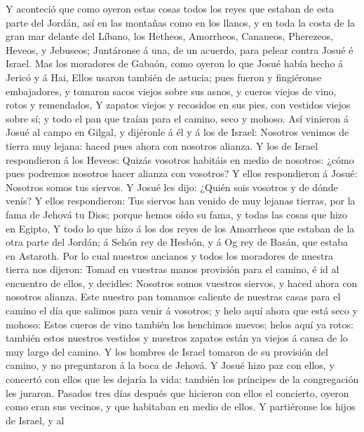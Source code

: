  Y aconteció que como oyeron estas cosas todos los reyes
que estaban de esta parte del Jordán, así en las montañas como en los
llanos, y en toda la costa de la gran mar delante del Líbano, los
Hetheos, Amorrheos, Cananeos, Pherezeos, Heveos, y Jebuseos;
 Juntáronse á una, de un acuerdo, para pelear contra Josué
é Israel.  Mas los moradores de Gabaón, como oyeron lo que
Josué había hecho á Jericó y á Hai,  Ellos usaron también
de astucia; pues fueron y fingiéronse embajadores, y tomaron sacos
viejos sobre sus asnos, y cueros viejos de vino, rotos y remendados,
 Y zapatos viejos y recosidos en sus pies, con vestidos
viejos sobre sí; y todo el pan que traían para el camino, seco y mohoso.
 Así vinieron á Josué al campo en Gilgal, y dijéronle á él
y á los de Israel: Nosotros venimos de tierra muy lejana: haced pues
ahora con nosotros alianza.  Y los de Israel respondieron
á los Heveos: Quizás vosotros habitáis en medio de nosotros: ¿cómo pues
podremos nosotros hacer alianza con vosotros?  Y ellos
respondieron á Josué: Nosotros somos tus siervos. Y Josué les dijo:
¿Quién sois vosotros y de dónde venís?  Y ellos
respondieron: Tus siervos han venido de muy lejanas tierras, por la fama
de Jehová tu Dios; porque hemos oído su fama, y todas las cosas que hizo
en Egipto,  Y todo lo que hizo á los dos reyes de los
Amorrheos que estaban de la otra parte del Jordán; á Sehón rey de
Hesbón, y á Og rey de Basán, que estaba en Astaroth.  Por
lo cual nuestros ancianos y todos los moradores de nuestra tierra nos
dijeron: Tomad en vuestras manos provisión para el camino, é id al
encuentro de ellos, y decidles: Nosotros somos vuestros siervos, y haced
ahora con nosotros alianza.  Este nuestro pan tomamos
caliente de nuestras casas para el camino el día que salimos para venir
á vosotros; y helo aquí ahora que está seco y mohoso: 
Estos cueros de vino también los henchimos nuevos; helos aquí ya rotos:
también estos nuestros vestidos y nuestros zapatos están ya viejos á
causa de lo muy largo del camino.  Y los hombres de
Israel tomaron de su provisión del camino, y no preguntaron á la boca de
Jehová.  Y Josué hizo paz con ellos, y concertó con ellos
que les dejaría la vida: también los príncipes de la congregación les
juraron.  Pasados tres días después que hicieron con
ellos el concierto, oyeron como eran sus vecinos, y que habitaban en
medio de ellos.  Y partiéronse los hijos de Israel, y al
